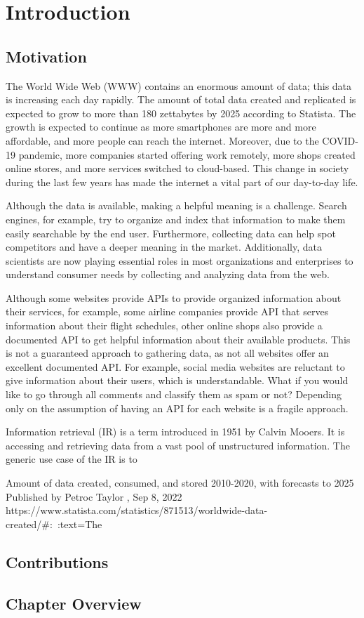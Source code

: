\chapter{Introduction}
\label{chap:introduction}
\section{Motivation}

The World Wide Web (WWW) contains an enormous amount of data; this data is increasing each day rapidly. The amount of total data created and replicated is expected to grow to more than 180 zettabytes by 2025 according to Statista. The growth is expected to continue as more smartphones are more and more affordable, and more people can reach the internet. Moreover, due to the COVID-19 pandemic, more companies started offering work remotely, more shops created online stores, and more services switched to cloud-based. This change in society during the last few years has made the internet a vital part of our day-to-day life.   

Although the data is available, making a helpful meaning is a challenge. Search engines, for example, try to organize and index that information to make them easily searchable by the end user. Furthermore, collecting data can help spot competitors and have a deeper meaning in the market. Additionally, data scientists are now playing essential roles in most organizations and enterprises to understand consumer needs by collecting and analyzing data from the web.  


Although some websites provide APIs to provide organized information about their services, for example, some airline companies provide API that serves information about their flight schedules, other online shops also provide a documented API to get helpful information about their available products. This is not a guaranteed approach to gathering data, as not all websites offer an excellent documented API. For example, social media websites are reluctant to give information about their users, which is understandable. What if you would like to go through all comments and classify them as spam or not? Depending only on the assumption of having an API for each website is a fragile approach. 

Information retrieval (IR) is a term introduced in 1951 by Calvin
Mooers. It is accessing and retrieving data from a vast pool of unstructured information. The generic use case of the IR is to 

Amount of data created, consumed, and stored 2010-2020, with forecasts to 2025
Published by 
Petroc Taylor
, Sep 8, 2022
https://www.statista.com/statistics/871513/worldwide-data-created/#:~:text=The%
\section{Contributions}
\section{Chapter Overview}
